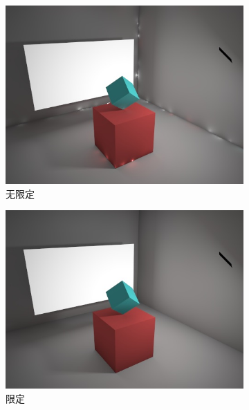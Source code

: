 \begin{figure}
\begin{fullwidth}
	\begin{subfigure}[b]{0.246\thewidth}
		\includegraphics[width=1.0\textwidth]{figures/ir/vpl-noclamping}
		\caption{无限定}
	\end{subfigure}
	\begin{subfigure}[b]{0.246\thewidth}
		\includegraphics[width=1.0\textwidth]{figures/ir/vpl-clamping}
		\caption{限定}
	\end{subfigure}
	\begin{subfigure}[b]{0.246\thewidth}

\end{subfigure}
\end{fullwidth}
\end{figure}
